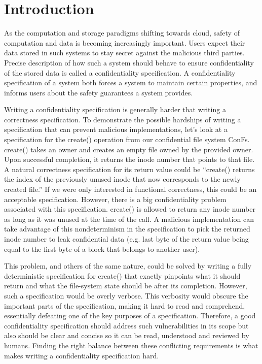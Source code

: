 
\section{Introduction}
As the computation and storage paradigms shifting towards cloud, safety of computation and data is becoming increasingly important.
Users expect their data stored in such systems to stay secret against the malicious third parties. 
Precise description of how such a system should behave to ensure confidentiality of the stored data is called a confidentiality specification. A confidentiality specification of a system both forces a system to maintain certain properties, and informs users about the safety guarantees a system provides.

Writing a confidentiality specification is generally harder that writing a correctness specification. To demonstrate the possible hardships of writing a specification that can prevent malicious implementations, let's look at a specification for the create() operation from our confidential file system ConFs. create() takes an owner and creates an empty file owned by the provided owner. Upon successful completion, it returns the inode number that points to that file. A natural correctness specification for its return value could be ``create() returns the index of the previously unused inode that now corresponds to the newly created file.'' If we were only interested in functional correctness, this could be an acceptable specification. However, there is a big confidentiality problem  associated with this specification. create() is allowed to return any inode number as long as it was unused at the time of the call. A malicious implementation can take advantage of this nondeterminism in the specification to pick the returned inode number to leak confidential data (e.g. last byte of the return value being equal to the first byte of a block that belongs to another user).

This problem, and others of the same nature, could be solved by writing a fully deterministic specification for create() that exactly pinpoints what it should return and what the file-system state should be after its completion. However, such a specification would be overly verbose. This verbosity would obscure the important parts of the specification, making it hard to read and comprehend, essentially defeating one of the key purposes of a specification. Therefore, a good confidentiality specification should address such vulnerabilities in its scope but also should be clear and concise so it can be read, understood and reviewed by humans. Finding the right balance between these conflicting requirements is what makes writing a confidentiality specification hard.

